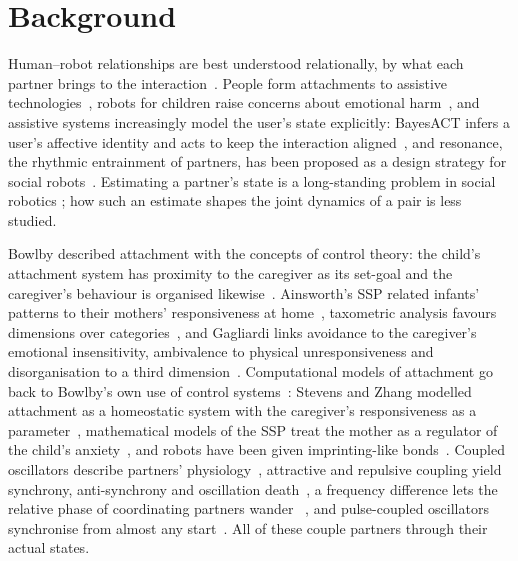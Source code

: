 \documentclass[journal]{IEEEtran}
\newif\ifdraftmarkers
\newcommand{\citeneeded}[1]{\ifdraftmarkers\textcolor{red}{[CITE:~#1]}\addtocontents{cnd}{\protect\item #1}\fi}
\newcommand{\authornote}[1]{\ifdraftmarkers\textcolor{blue}{\textit{[Authors: #1]}}\fi}
\begin{document}
\section{Background}
\label{sec:background}
Human--robot relationships are best understood relationally, by what each partner brings to the interaction~\cite{Prescott2021}. People form attachments to assistive technologies~\cite{Collins2013}, robots for children raise concerns about emotional harm~\cite{Sharkey2010}, and assistive systems increasingly model the user's state explicitly: BayesACT infers a user's affective identity and acts to keep the interaction aligned~\cite{Robillard2018}, and resonance, the rhythmic entrainment of partners, has been proposed as a design strategy for social robots~\cite{Lomas2022resonance}. Estimating a partner's state is a long-standing problem in social robotics \citeneeded{user-state estimation / theory of mind in social robotics}; how such an estimate shapes the joint dynamics of a pair is less studied.

Bowlby described attachment with the concepts of control theory: the child's attachment system has proximity to the caregiver as its set-goal and the caregiver's behaviour is organised likewise~\cite{Bowlby1982}. Ainsworth's SSP related infants' patterns to their mothers' responsiveness at home~\cite{Ainsworth1978}, taxometric analysis favours dimensions over categories~\cite{Fraley2003infant}, and Gagliardi links avoidance to the caregiver's emotional insensitivity, ambivalence to physical unresponsiveness and disorganisation to a third dimension~\cite{Gagliardi2021our,Gagliardi2022}. Computational models of attachment go back to Bowlby's own use of control systems~\cite{Petters2019attachment}: Stevens and Zhang modelled attachment as a homeostatic system with the caregiver's responsiveness as a parameter~\cite{Stevens2009dynamic}, mathematical models of the SSP treat the mother as a regulator of the child's anxiety~\cite{Buono2006}, and robots have been given imprinting-like bonds~\cite{Canamero2011}. Coupled oscillators describe partners' physiology~\cite{Helm2012coupled,Palumbo2016interpersonal}, attractive and repulsive coupling yield synchrony, anti-synchrony and oscillation death~\cite{Dixit2019dynamics}, a frequency difference lets the relative phase of coordinating partners wander~\cite{Kelso1995} \authornote{chapter of~\cite{Kelso1995}}, and pulse-coupled oscillators synchronise from almost any start~\cite{Mirollo1990}. All of these couple partners through their actual states.
\end{document}
